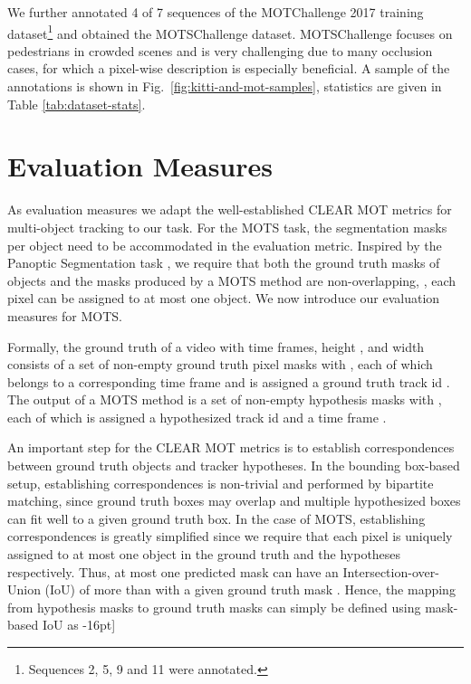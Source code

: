 \documentclass[10pt,twocolumn,letterpaper]{article}
\newcommand{\PAR}[1]{\vskip1pt \noindent {\bf #1~}}
\newcounter{row}
\begin{document}
\PAR{MOTSChallenge.}
We further annotated 4 of 7 sequences of the MOTChallenge 2017 \cite{Milan16Arxiv} training dataset\footnote{Sequences 2, 5, 9 and 11 were annotated.} and obtained the MOTSChallenge dataset.
MOTSChallenge focuses on pedestrians in crowded scenes and is very challenging due to many occlusion cases, for which a pixel-wise description is especially beneficial. A sample of the annotations is shown in Fig.~\ref{fig:kitti-and-mot-samples}, statistics are given in Table \ref{tab:dataset-stats}.


\section{Evaluation Measures}\label{sec:eval_measures}
As evaluation measures we adapt the well-established CLEAR MOT metrics for multi-object tracking \cite{Bernardin2008Eurasip} to our task. For the MOTS task, the segmentation masks per object need to be accommodated in the evaluation metric. Inspired by the Panoptic Segmentation task \cite{Kirillov18Arxiv}, we require that both the ground truth masks of objects and the masks produced by a MOTS method are non-overlapping, \ie, each pixel can be assigned to at most one object. We now introduce our evaluation measures for MOTS.

Formally, the ground truth of a video with  time frames, height , and width  consists of a set of  non-empty ground truth pixel masks  with , each of which belongs to a corresponding time frame  and is assigned a ground truth track id . The output of a MOTS method is a set of  non-empty hypothesis masks  with , each of which is assigned a hypothesized track id  and a time frame .

\PAR{Establishing Correspondences.}
An important step for the CLEAR MOT metrics \cite{Bernardin2008Eurasip} is to establish correspondences between ground truth objects and tracker hypotheses. In the bounding box-based setup, establishing correspondences is non-trivial and performed by bipartite matching, since ground truth boxes may overlap and multiple hypothesized boxes can fit well to a given ground truth box.
In the case of MOTS, establishing correspondences is greatly simplified since we require that each pixel is uniquely assigned to at most one object in the ground truth and the hypotheses respectively. Thus, at most one predicted mask can have an Intersection-over-Union (IoU) of more than  with a given ground truth mask \cite{Kirillov18Arxiv}. Hence, the mapping  from hypothesis masks to ground truth masks can simply be defined using mask-based IoU as
\vspace{-6pt}
-16pt]\nonumber
\end{document}

